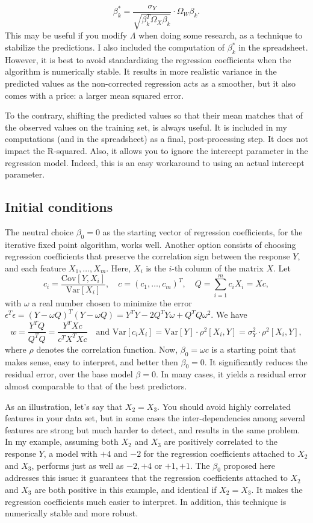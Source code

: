 \documentclass[oneside,10pt]{book}
\begin{document}
$$
\beta_k^* = \frac{\sigma_Y}{\sqrt{\beta_k^T\Omega_X\beta_k}} \cdot \Omega_W\beta_k.
$$
This may be useful if you modify $\Lambda$ when doing some research, as a technique to stabilize the predictions. I also included the computation of $\beta^*_k$ in the spreadsheet. However, it is best to avoid standardizing the regression coefficients when the algorithm is numerically stable. It results in more realistic variance in the predicted values as the non-corrected regression acts as a smoother, but it also comes with a price: a larger mean squared error.

To the contrary, shifting the predicted values so that their mean matches that of the observed values on the training set, is always useful. It is included in my computations (and in the spreadsheet) as a final, post-processing step. It does not impact  the R-squared. Also, it allows you to ignore the intercept parameter in the regression model. Indeed, this is an easy workaround to using an actual intercept parameter.

\subsection{Initial conditions}\label{reg3b}

The neutral choice $\beta_0=0$ as the starting vector of regression coefficients, for the iterative fixed point algorithm, works well. Another option consists of choosing regression coefficients that preserve the correlation sign between the response $Y$, and each feature $X_1,\dots,X_m$. Here, $X_i$ is the $i$-th column of the matrix $X$. Let
$$c_i= \frac{\text{Cov}[Y,X_i]}{\text{Var}[X_i]}, \quad c=(c_1,\dots,c_m)^T, \quad Q=\sum_{i=1}^m c_i X_i = Xc,$$
with $\omega$ a real number chosen to minimize the error $\epsilon^T\epsilon = (Y-\omega Q)^T(Y-\omega Q) = Y^TY-2Q^TY\omega+Q^T Q\omega^2$. We have
$$w=\frac{Y^TQ}{Q^TQ}=\frac{Y^TXc}{c^T X^T X c} \quad \text{and } \text{Var}[c_i X_i]=\text{Var}[Y]\cdot\rho^2[X_i,Y]=\sigma^2_Y\cdot\rho^2[X_i,Y],$$
where $\rho$ denotes the correlation function. Now,  $\beta_0=\omega c$ is a starting point that makes sense, easy to interpret, and better then $\beta_0=0$. It significantly reduces the residual error, over the base model $\beta=0$. In many cases, it yields a residual error almost comparable to that of the best predictors.

As an illustration, let's say that $X_2=X_3$. You should avoid highly correlated features in your data set, but in some cases the inter-dependencies among several features are strong but much harder to detect, and results in the same problem. In my example, assuming both $X_2$ and $X_3$ are positively correlated to the response $Y$, a model with $+4$ and $-2$ for the regression coefficients attached to $X_2$ and $X_3$, performs just as well as $-2, +4$ or $+1, +1$. The $\beta_0$ proposed here addresses this issue: it guarantees that the regression coefficients attached to $X_2$ and $X_3$ are both positive in this example, and identical if $X_2=X_3$. It makes the regression coefficients much easier to interpret. In addition, this technique is numerically stable and more robust.
\end{document}
